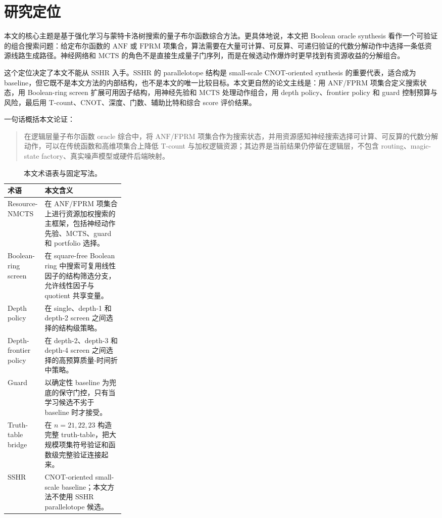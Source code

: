 \documentclass[UTF8,fontset=macnew,11pt]{ctexart}
\newcommand{\method}{Resource-NMCTS}
\newcommand{\screen}{Boolean-ring screen}
\newcommand{\anf}{\ensuremath{\mathrm{ANF}}}
\newcommand{\fprm}{\ensuremath{\mathrm{FPRM}}}
\newcommand{\mcts}{\ensuremath{\mathrm{MCTS}}}
\newcommand{\ttable}{truth-table}
\begin{document}
\section{研究定位}

本文的核心主题是基于强化学习与蒙特卡洛树搜索的量子布尔函数综合方法。更具体地说，本文把 Boolean oracle synthesis 看作一个可验证的组合搜索问题：给定布尔函数的 \anf{} 或 \fprm{} 项集合，算法需要在大量可计算、可反算、可递归验证的代数分解动作中选择一条低资源线路生成路径。神经网络和 \mcts{} 的角色不是直接生成量子门序列，而是在候选动作爆炸时更早找到有资源收益的分解组合。

这个定位决定了本文不能从 SSHR 入手。SSHR 的 parallelotope 结构是 small-scale CNOT-oriented synthesis 的重要代表，适合成为 baseline，但它既不是本文方法的内部结构，也不是本文的唯一比较目标。本文更自然的论文主线是：用 \anf{}/\fprm{} 项集合定义搜索状态，用 Boolean-ring screen 扩展可用因子结构，用神经先验和 \mcts{} 处理动作组合，用 depth policy、frontier policy 和 guard 控制预算与风险，最后用 T-count、CNOT、深度、门数、辅助比特和综合 score 评价结果。

一句话概括本文论证：

\begin{quote}
在逻辑层量子布尔函数 oracle 综合中，将 \anf{}/\fprm{} 项集合作为搜索状态，并用资源感知神经搜索选择可计算、可反算的代数分解动作，可以在传统函数和高维项集合上降低 T-count 与加权逻辑资源；其边界是当前结果仍停留在逻辑层，不包含 routing、magic-state factory、真实噪声模型或硬件后端映射。
\end{quote}

\begin{table}[H]
\centering
\small
\caption{本文术语表与固定写法。}
\label{tab:terms-v27}
\begin{tabularx}{\linewidth}{>{\raggedright\arraybackslash}p{0.27\linewidth}>{\raggedright\arraybackslash}X}
\toprule
术语 & 本文含义 \\
\midrule
\method{} & 在 \anf{}/\fprm{} 项集合上进行资源加权搜索的主框架，包括神经动作先验、\mcts{}、guard 和 portfolio 选择。 \\
\screen{} & 在 square-free Boolean ring 中搜索可复用线性因子的结构筛选分支，允许线性因子与 quotient 共享变量。 \\
Depth policy & 在 single、depth-1 和 depth-2 screen 之间选择的结构级策略。 \\
Depth-frontier policy & 在 depth-2、depth-3 和 depth-4 screen 之间选择的高预算质量-时间折中策略。 \\
Guard & 以确定性 baseline 为兜底的保守门控，只有当学习候选不劣于 baseline 时才接受。 \\
Truth-table bridge & 在 $n=21,22,23$ 构造完整 \ttable{}，把大规模项集符号验证和函数级完整验证连接起来。 \\
SSHR & CNOT-oriented small-scale baseline；本文方法不使用 SSHR parallelotope 候选。 \\
\bottomrule
\end{tabularx}
\end{table}
\end{document}
